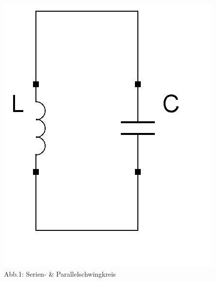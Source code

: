 \begin{frame}
\begin{center}
    \includegraphics[scale=0.4]{a04/Schwingkreis_parallel.png}\\
    Abb.1: Serien- \& Parallelschwingkreis
  \end{center}
\end{frame}


